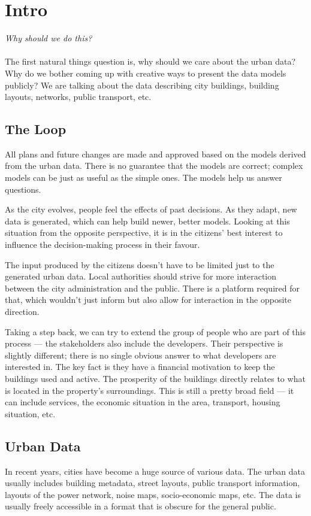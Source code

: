 \section{Intro}
\textit{Why should we do this?}

\paragraph{}The first natural things question is, why should we care about the urban data? Why do we bother coming up with creative ways to present the data models publicly? We are talking about the data describing city buildings, building layouts, networks, public transport, etc. 

\subsection{The Loop}

All plans and future changes are made and approved based on the models derived from the urban data. There is no guarantee that the models are correct; complex models can be just as useful as the simple ones. The models help us answer questions.

As the city evolves, people feel the effects of past decisions. As they adapt, new data is generated, which can help build newer, better models. Looking at this situation from the opposite perspective, it is in the citizens' best interest to influence the decision-making process in their favour. 

The input produced by the citizens doesn't have to be limited just to the generated urban data. Local authorities should strive for more interaction between the city administration and the public. There is a platform required for that, which wouldn't just inform but also allow for interaction in the opposite direction. 

Taking a step back, we can try to extend the group of people who are part of this process --- the stakeholders also include the developers. Their perspective is slightly different; there is no single obvious answer to what developers are interested in. The key fact is they have a financial motivation to keep the buildings used and active. The prosperity of the buildings directly relates to what is located in the property's surroundings. This is still a pretty broad field --- it can include services, the economic situation in the area, transport, housing situation, etc. 

\subsection{Urban Data}
In recent years, cities have become a huge source of various data. The urban data usually includes building metadata, street layouts, public transport information, layouts of the power network, noise maps, socio-economic maps, etc. The data is usually freely accessible in a format that is obscure for the general public. 

